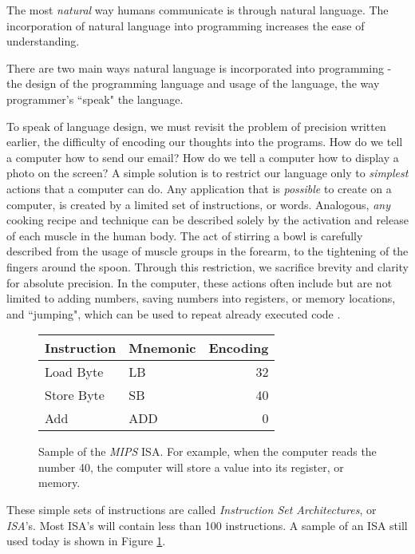 \documentclass[12pt]{article}
\begin{document}
\begin{flushleft}
\begin{enumerate}
The most \textit{natural} way humans communicate is through natural
language. The incorporation of natural language into programming
increases the ease of understanding.
\end{enumerate}
There are two main ways natural language is incorporated into programming
- the design of the programming language and usage of the language, the
way programmer's ``speak" the language.

To speak of language design, we must revisit the problem of precision
written earlier, the difficulty of encoding our thoughts into the programs.
How do we tell a computer how to send our email?
How do we tell a computer how to display a photo on the screen?
A simple solution is to restrict our language only to \textit{simplest}
actions that a computer can do. Any application that is \textit{possible} to
create on a computer, is created by a limited set of instructions, or words.
Analogous, \textit{any} cooking recipe and technique can be described solely
by the activation and release of each muscle in the human body. The act
of stirring a bowl is carefully described from the usage of muscle groups
in the forearm, to the tightening of the fingers around the spoon.
Through this restriction, we sacrifice brevity and clarity for absolute
precision.
In the computer, these actions often include but are not limited to
adding numbers, saving numbers into registers, or memory locations,
and ``jumping", which can be used to repeat already executed code \footnotemark.

\begin{figure}[h]
\centering
\caption[Caption for LOF]{
Sample of the \textit{MIPS} ISA.
For example, when the computer reads the number 40, the computer will store
a value into its register, or memory. \footnotemark
}
\begin{tabular}{l l r}
Instruction & Mnemonic & Encoding \\
\hline
Load Byte & LB & 32 \\
Store Byte & SB & 40 \\
Add & ADD & 0 \\
\end{tabular}

\label{fig:MIPS_sample}
\end{figure}

These simple sets of instructions are called
\textit{Instruction Set Architectures}, or \textit{ISA}'s. Most ISA's will
contain less than 100 instructions. A sample of an ISA still used today is shown
in Figure \ref{fig:MIPS_sample}.


\end{flushleft}
\end{document}
